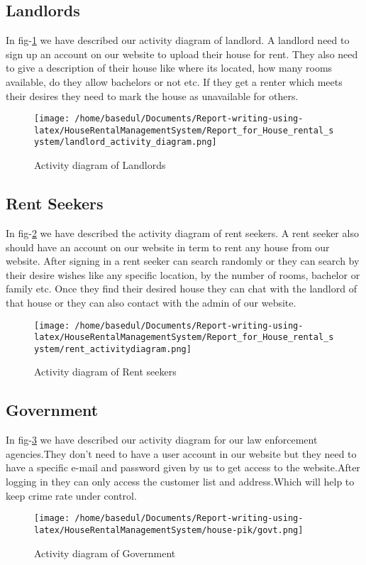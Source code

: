 \documentclass[12pt,a4paper]{report}
\newcommand\tab[1][0cm]{\hspace*{#1}}
\begin{document}
    \subsection{Landlords}
    \tab In fig-\ref{fig:landlord-dfd} we have described our activity diagram of landlord. A landlord need to sign up an account on
our website to upload their house for rent. They also need to give a description of their house like where
its located, how many rooms available, do they allow bachelors or not etc. If they get a renter which
meets their desires they need to mark the house as unavailable for others.	
			\begin{figure}[H]
				\centering
				\texttt{[image: /home/basedul/Documents/Report-writing-using-latex/HouseRentalManagementSystem/Report\_for\_House\_rental\_system/landlord\_activity\_diagram.png]}
				\caption{\hspace{0.35em}Activity diagram of Landlords}
				\label{fig:landlord-dfd} 
			\end{figure}
			
	\subsection{Rent Seekers}
	\tab In fig-\ref{fig:rent-dfd} we have described the activity diagram of rent seekers. A rent seeker also should have an
account on our website in term to rent any house from our website. After signing in a rent seeker can
search randomly or they can search by their desire wishes like any specific location, by the number of
rooms, bachelor or family etc. Once they find their desired house they can chat with the landlord of that
house or they can also contact with the admin of our website.
			\begin{figure}[H]
				\centering
				\texttt{[image: /home/basedul/Documents/Report-writing-using-latex/HouseRentalManagementSystem/Report\_for\_House\_rental\_system/rent\_activitydiagram.png]}
				\caption{\hspace{0.35em}Activity diagram of Rent seekers}
				\label{fig:rent-dfd} 
			\end{figure}
			
			
			\subsection{Government}
	\tab In fig-\ref{fig:govt-dfd} we have described our activity diagram for our law enforcement agencies.They don't need to have a user account in our website but they need to have a specific e-mail and password given by us to get access to the website.After logging in they can only access the customer list and address.Which will help to keep crime rate under control. 
			\begin{figure}[H]
				\centering
				\texttt{[image: /home/basedul/Documents/Report-writing-using-latex/HouseRentalManagementSystem/house-pik/govt.png]}
				\caption{\hspace{0.35em}Activity diagram of Government}
				\label{fig:govt-dfd} 
			\end{figure}
			
\end{document}
